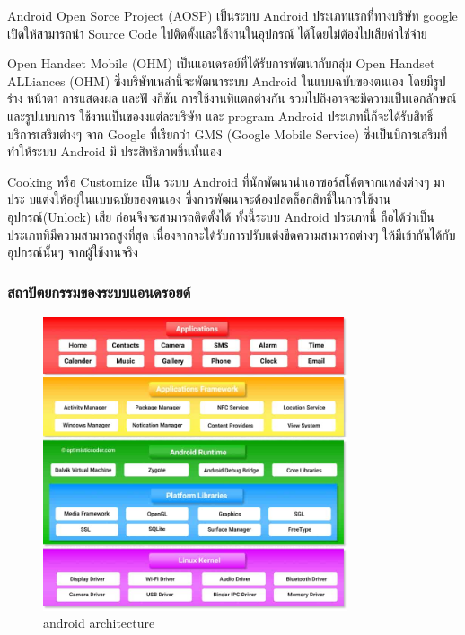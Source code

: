 Android Open Sorce Project (AOSP) เป็นระบบ Android ประเภทแรกที่ทางบริษัท google
เปิดให้สามารถนํา Source Code ไปติดตั้งและใช้งานในอุปกรณ์ ได้โดยไม่ต้องไปเสียค่าใช่จ่าย

Open Handset Mobile (OHM) เป็นแอนดรอย์ที่ได้รับการพัฒนากับกลุ่ม Open Handset ALLiances (OHM) ซึ่งบริษัทเหล่านี้จะพัฒนาระบบ Android ในแบบฉบับของตนเอง โดยมีรูปร่าง หน้าตา
การแสดงผล และฟั งกืชัน การใช้งานที่แตกต่างกัน รวมไปถึงอาจจะมีความเป็นเอกลักษณ์ และรูปแบบการ
ใช้งานเป็นของงแต่ละบริษัท และ program Android ประเภทนี้ก็จะได้รับสิทธิ์ บริการเสริมต่างๆ จาก
Google ที่เรียกว่า GMS (Google Mobile Service) ซึ่งเป็นบิการเสริมที่ ทําให้ระบบ Android มี
ประสิทธิภาพขึ้นนั้นเอง

Cooking หรือ Customize เป็น ระบบ Android ที่นักพัฒนานําเอาซอร์สโค้ตจากแหล่งต่างๆ มาประ
บแต่งให้อยุ่ในแบบฉบัยของตนเอง ซึ่งการพัฒนาจะต้องปลดล็อกสิทธิ์ในการใช้งานอุปกรณ์(Unlock) เสีย
ก่อนจึงจะสามารถติดตั้งได้ ทั้งนี้ระบบ Android ประเภทนี้ ถือได้ว่าเป็นประเภทที่มีความสามารถสูงที่สุด
เนื่องจากจะได้รับการปรับแต่งขีดความสามารถต่างๆ ให้มีเข้ากันได้กับอุปกรณ์นั้นๆ จากผู้ใช้งานจริง


\subsubsection{สถาปัตยกรรมของระบบแอนดรอยด์}
\begin{figure}[h]
  \begin{center}
    \includegraphics[width=0.8\textwidth]{./image/architecture.jpg}
  \end{center}
  \caption[android architecture]{android architecture}
  \label{fig:walrus}
  \end{figure}

